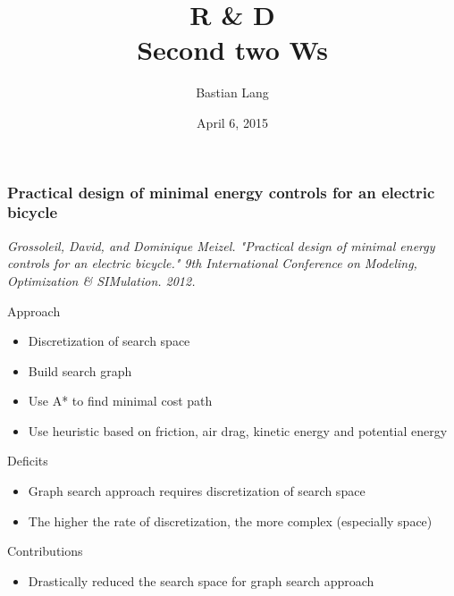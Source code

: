 \documentclass[8pt]{beamer}
\title[R \& D]{R \& D\\Second two Ws} %
\author{Bastian Lang} %
\institute[BRSU] %
{
Master of Autonomous Systems \\ %
}
\date{April 6, 2015}
\begin{document}
\listoffigures



\begin{frame}
	\frametitle{Practical design of minimal energy controls for an electric bicycle}
	\textit{Grossoleil, David, and Dominique Meizel. "Practical design of minimal energy controls for an electric bicycle." 9th International Conference on Modeling, Optimization \& SIMulation. 2012.}\vspace{5mm}
	
	Approach
	\begin{itemize}
		\item Discretization of search space 
		\item Build search graph
		\item Use A* to find minimal cost path
		\item Use heuristic based on friction, air drag, kinetic energy and potential energy
	\end{itemize}
	
	Deficits
	\begin{itemize}
		\item Graph search approach requires discretization of search space
		\item The higher the rate of discretization, the more complex (especially space)
	\end{itemize}
	
	Contributions
	\begin{itemize}
		\item Drastically reduced the search space for graph search approach
	\end{itemize}
\end{frame}
\end{document}
